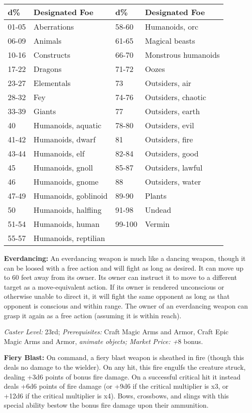 \documentclass{article}
\begin{document}
\vspace{12pt}
\begin{tabular}{|>{\raggedright}p{34pt}|>{\raggedright}p{112pt}|>{\raggedright}p{40pt}|>{\raggedright}p{112pt}|}
\hline
d\textbf{\%} & D\textbf{esignated Foe} & d\textbf{\%} & D\textbf{esignated Foe}\tabularnewline
\hline
01-05 & Aberrations & 58-60 & Humanoids, orc\tabularnewline
\hline
06-09 & Animals & 61-65 & Magical beasts\tabularnewline
\hline
10-16 & Constructs & 66-70 & Monstrous humanoids\tabularnewline
\hline
17-22 & Dragons & 71-72 & Oozes\tabularnewline
\hline
23-27 & Elementals & 73 & Outsiders, air\tabularnewline
\hline
28-32 & Fey & 74-76 & Outsiders, chaotic\tabularnewline
\hline
33-39 & Giants & 77 & Outsiders, earth\tabularnewline
\hline
40 & Humanoids, aquatic & 78-80 & Outsiders, evil\tabularnewline
\hline
41-42 & Humanoids, dwarf & 81 & Outsiders, fire\tabularnewline
\hline
43-44 & Humanoids, elf & 82-84 & Outsiders, good\tabularnewline
\hline
45 & Humanoids, gnoll & 85-87 & Outsiders, lawful\tabularnewline
\hline
46 & Humanoids, gnome & 88 & Outsiders, water\tabularnewline
\hline
47-49 & Humanoids, goblinoid & 89-90 & Plants\tabularnewline
\hline
50 & Humanoids, halfling & 91-98 & Undead\tabularnewline
\hline
51-54 & Humanoids, human & 99-100 & Vermin\tabularnewline
\hline
55-57 & Humanoids, reptilian &  & \tabularnewline
\hline
\end{tabular}\newpage

\newpage
\vspace{12pt}
\textbf{Everdancing: }An everdancing weapon is much like a dancing weapon, though 
it can be loosed with a free action and will fight as long as desired. It can move 
up to 60 feet away from its owner. Its owner can instruct it to move to a different 
target as a move-equivalent action. If its owner is rendered unconscious or otherwise 
unable to direct it, it will fight the same opponent as long as that opponent is 
conscious and within range. The owner of an everdancing weapon can grasp it again 
as a free action (assuming it is within reach). 

\textit{Caster Level: }23rd; \textit{Prerequisites: }Craft Magic Arms and Armor, 
Craft Epic Magic Arms and Armor, \textit{animate objects; Market Price: +}8 bonus. 

\textbf{Fiery Blast: }On command, a fiery blast weapon is sheathed in fire (though 
this deals no damage to the wielder). On any hit, this fire engulfs the creature 
struck, dealing +3d6 points of bonus fire damage. On a successful critical hit 
it instead deals +6d6 points of fire damage (or +9d6 if the critical multiplier 
is x3, or +12d6 if the critical multiplier is x4). Bows, crossbows, and slings 
with this special ability bestow the bonus fire damage upon their ammunition. 
\end{document}
